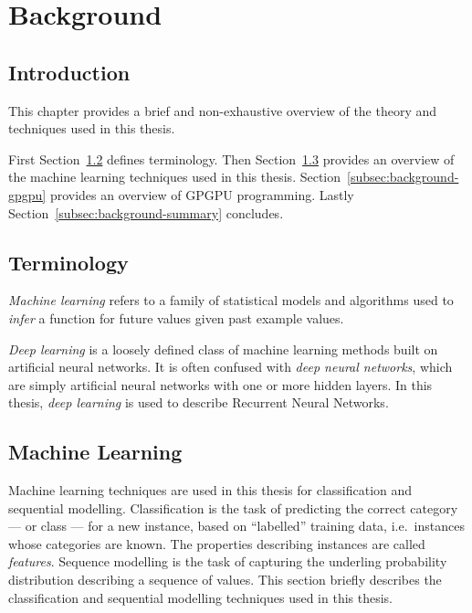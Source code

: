 \chapter{Background}
\label{chap:background}

\section{Introduction}

This chapter provides a brief and non-exhaustive overview of the theory and techniques used in this thesis.

First Section~\ref{subsec:background-terminology} defines terminology. Then Section~\ref{subsec:background-machine-learning} provides an overview of the machine learning techniques used in this thesis. Section~\ref{subsec:background-gpgpu} provides an overview of GPGPU programming. %
Lastly Section~\ref{subsec:background-summary} concludes.


\section{Terminology}
\label{subsec:background-terminology}

\emph{Machine learning} refers to a family of statistical models and algorithms used to \emph{infer} a function for future values given past example values.

\emph{Deep learning} is a loosely defined class of machine learning methods built on artificial neural networks. It is often confused with \emph{deep neural networks}, which are simply artificial neural networks with one or more hidden layers. In this thesis, \emph{deep learning} is used to describe Recurrent Neural Networks.





\section{Machine Learning}
\label{subsec:background-machine-learning}

Machine learning techniques are used in this thesis for classification and sequential modelling. Classification is the task of predicting the correct category --- or class --- for a new instance, based on ``labelled'' training data, i.e.\ instances whose categories are known. The properties describing instances are called \emph{features}. Sequence modelling is the task of capturing the underling probability distribution describing a sequence of values. This section briefly describes the classification and sequential modelling techniques used in this thesis.


